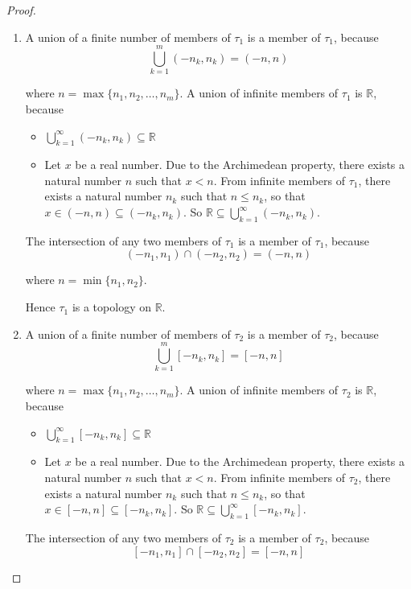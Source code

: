 \begin{proof}
	\begin{enumerate}[label={(\roman*)}]
		\item A union of a finite number of members of $\tau_{1}$ is a member of $\tau_{1}$, because
		      \[
			      \bigcup^{m}_{k=1} (-n_{k}, n_{k}) = (-n, n)
		      \]

		      where $n = \max\{ n_{1}, n_{2}, \ldots, n_{m} \}$. A union of infinite members of $\tau_{1}$ is $\mathbb{R}$, because
		      \begin{itemize}
			      \item $\bigcup^{\infty}_{k=1} (-n_{k}, n_{k})\subseteq \mathbb{R}$
			      \item Let $x$ be a real number. Due to the Archimedean property, there exists a natural number $n$ such that $x < n$. From infinite members of $\tau_{1}$, there exists a natural number $n_{k}$ such that $n\leq n_{k}$, so that $x\in (-n, n)\subseteq (-n_{k}, n_{k})$. So $\mathbb{R}\subseteq \bigcup^{\infty}_{k=1} (-n_{k}, n_{k})$.
		      \end{itemize}

		      The intersection of any two members of $\tau_{1}$ is a member of $\tau_{1}$, because
		      \[
			      (-n_{1}, n_{1})\cap (-n_{2}, n_{2}) = (-n, n)
		      \]

		      where $n = \min\{ n_{1}, n_{2} \}$.

		      Hence $\tau_{1}$ is a topology on $\mathbb{R}$.
		\item A union of a finite number of members of $\tau_{2}$ is a member of $\tau_{2}$, because
		      \[
			      \bigcup^{m}_{k=1} [-n_{k}, n_{k}] = [-n, n]
		      \]

		      where $n = \max\{ n_{1}, n_{2}, \ldots, n_{m} \}$. A union of infinite members of $\tau_{2}$ is $\mathbb{R}$, because
		      \begin{itemize}
			      \item $\bigcup^{\infty}_{k=1} [-n_{k}, n_{k}]\subseteq \mathbb{R}$
			      \item Let $x$ be a real number. Due to the Archimedean property, there exists a natural number $n$ such that $x < n$. From infinite members of $\tau_{2}$, there exists a natural number $n_{k}$ such that $n\leq n_{k}$, so that $x\in [-n, n]\subseteq [-n_{k}, n_{k}]$. So $\mathbb{R}\subseteq \bigcup^{\infty}_{k=1} [-n_{k}, n_{k}]$.
		      \end{itemize}

		      The intersection of any two members of $\tau_{2}$ is a member of $\tau_{2}$, because
		      \[
			      [-n_{1}, n_{1}]\cap [-n_{2}, n_{2}] = [-n, n]
		      \]


\end{enumerate}
\end{proof}
